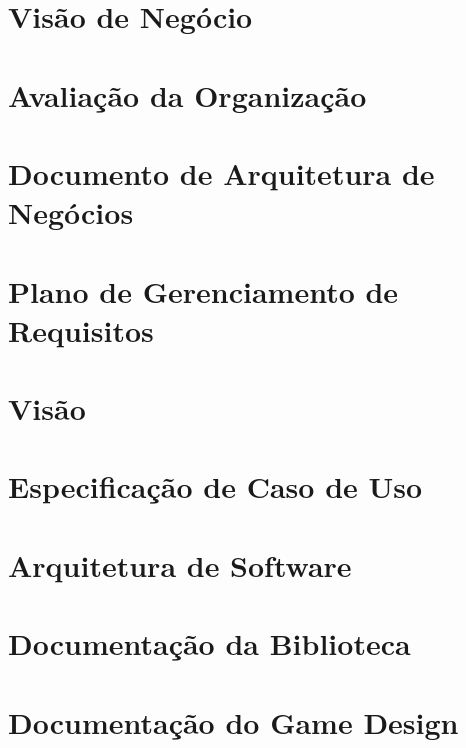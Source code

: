\documentclass[
	12pt,					%
	oneside,				%
	a4paper,				%
	chapter=TITLE,			%
	english,				%
	brazil					%
	]{abntex2}
\begin{document}
\begin{apendicesenv}

\partapendices %

\chapter{Visão de Negócio}
	
\chapter{Avaliação da Organização}
	
\chapter{Documento de Arquitetura de Negócios}
	
\chapter{Plano de Gerenciamento de Requisitos}
	
\chapter{Visão}

\chapter{Especificação de Caso de Uso}

\chapter{Arquitetura de Software}



\chapter{Documentação da Biblioteca}

\chapter{Documentação do Game Design}


\end{apendicesenv}


\printindex
\end{document}
